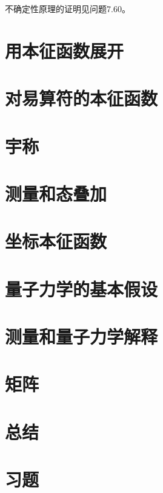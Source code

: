     不确定性原理的证明见问题7.60。

\section{用本征函数展开}
\label{sec:7.3 Expansion in Terms of Eigenfunctions}

\section{对易算符的本征函数}
\label{sec:7.4 Eigenfunctions of Commuting Operators}

\section{宇称}
\label{sec:7.5 Parity}

\section{测量和态叠加}
\label{sec:7.6 Measurement and the Superposition of States}

\section{坐标本征函数}
\label{sec:7.7 Position Eigenfunctions}

\section{量子力学的基本假设}
\label{sec:7.8 The Postulates of Quantum Mechanics}

\section{测量和量子力学解释}
\label{sec:7.9 Measurement and the Interpretation of Quantum Mechanics}

\section{矩阵}
\label{sec:7.10 Matrices}

\section*{总结}

\section*{习题}